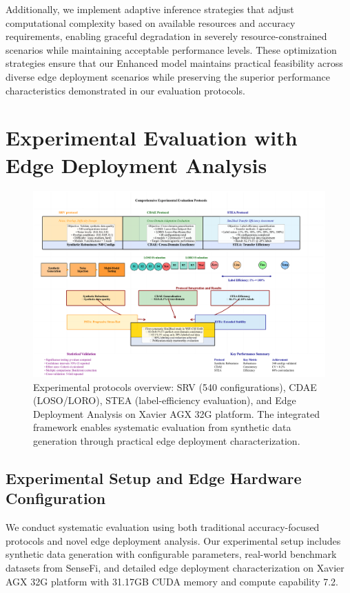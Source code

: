 \documentclass[journal]{IEEEtran}
\begin{document}
Additionally, we implement adaptive inference strategies that adjust computational complexity based on available resources and accuracy requirements, enabling graceful degradation in severely resource-constrained scenarios while maintaining acceptable performance levels. These optimization strategies ensure that our Enhanced model maintains practical feasibility across diverse edge deployment scenarios while preserving the superior performance characteristics demonstrated in our evaluation protocols.

\section{Experimental Evaluation with Edge Deployment Analysis}

\begin{figure}[t]
\centering
\includegraphics[width=\linewidth]{plots/fig4_experimental_protocols.pdf}
\caption{Experimental protocols overview: SRV (540 configurations), CDAE (LOSO/LORO), STEA (label-efficiency evaluation), and Edge Deployment Analysis on Xavier AGX 32G platform. The integrated framework enables systematic evaluation from synthetic data generation through practical edge deployment characterization.}
\label{fig:protocols}
\end{figure}

\subsection{Experimental Setup and Edge Hardware Configuration}

We conduct systematic evaluation using both traditional accuracy-focused protocols and novel edge deployment analysis. Our experimental setup includes synthetic data generation with configurable parameters, real-world benchmark datasets from SenseFi, and detailed edge deployment characterization on Xavier AGX 32G platform with 31.17GB CUDA memory and compute capability 7.2.
\end{document}
